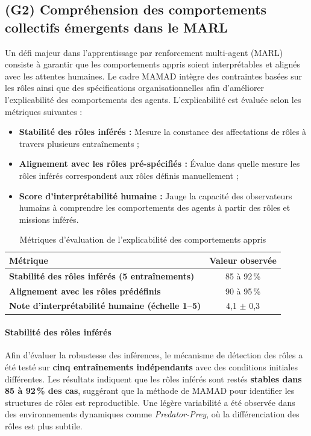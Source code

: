 \documentclass[pdflatex,sn-mathphys-num]{sn-jnl}%
\theoremstyle{thmstyleone}%
\theoremstyle{thmstyletwo}%
\theoremstyle{thmstylethree}%
\begin{document}
\subsection{(G2) Compréhension des comportements collectifs émergents dans le MARL}

Un défi majeur dans l'apprentissage par renforcement multi-agent (MARL) consiste à garantir que les comportements appris soient interprétables et alignés avec les attentes humaines. Le cadre MAMAD intègre des contraintes basées sur les rôles ainsi que des spécifications organisationnelles afin d'améliorer l'explicabilité des comportements des agents. L'explicabilité est évaluée selon les métriques suivantes :

\begin{itemize}
    \item \textbf{Stabilité des rôles inférés :} Mesure la constance des affectations de rôles à travers plusieurs entraînements ;
    \item \textbf{Alignement avec les rôles pré-spécifiés :} Évalue dans quelle mesure les rôles inférés correspondent aux rôles définis manuellement ;
    \item \textbf{Score d'interprétabilité humaine :} Jauge la capacité des observateurs humains à comprendre les comportements des agents à partir des rôles et missions inférés.
\end{itemize}

\begin{table}[h!]
    \centering
    \caption{Métriques d'évaluation de l'explicabilité des comportements appris}
    \begin{tabular}{lc}
        \hline
        \textbf{Métrique}                                       & \textbf{Valeur observée} \\
        \hline
        \textbf{Stabilité des rôles inférés (5 entraînements)} & 85 à 92\,\%              \\
        \hline
        \textbf{Alignement avec les rôles prédéfinis}          & 90 à 95\,\%              \\
        \hline
        \textbf{Note d'interprétabilité humaine (échelle 1–5)} & 4{,}1 $\pm$ 0{,}3        \\
        \hline
    \end{tabular}
    \label{tab:explainability}
\end{table}

\paragraph{Stabilité des rôles inférés}
Afin d'évaluer la robustesse des inférences, le mécanisme de détection des rôles a été testé sur \textbf{cinq entraînements indépendants} avec des conditions initiales différentes. Les résultats indiquent que les rôles inférés sont restés \textbf{stables dans 85 à 92\,\% des cas}, suggérant que la méthode de MAMAD pour identifier les structures de rôles est reproductible. Une légère variabilité a été observée dans des environnements dynamiques comme \textit{Predator-Prey}, où la différenciation des rôles est plus subtile.
\end{document}
